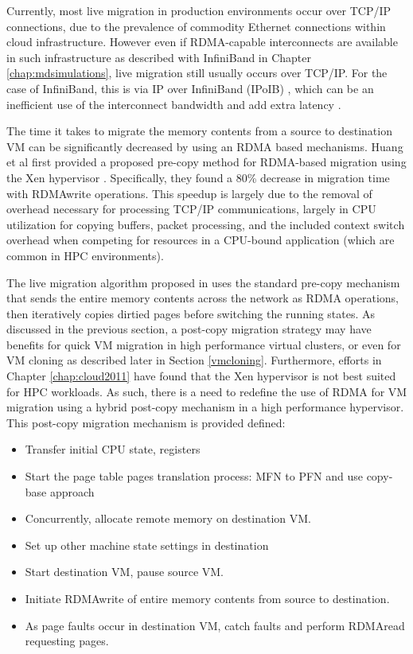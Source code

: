 Currently, most live migration in production environments occur over TCP/IP connections, due to the prevalence of commodity Ethernet connections within cloud infrastructure. However even if RDMA-capable interconnects are available in such infrastructure as described with InfiniBand in Chapter \ref{chap:mdsimulations}, live migration still usually occurs over TCP/IP. For the case of InfiniBand, this is via IP over InfiniBand (IPoIB) \cite{chu2006ipoib}, which can be an inefficient use of the interconnect bandwidth and add extra latency \cite{yu2008performance}. 

The time it takes to migrate the memory contents from a source to destination VM can be significantly decreased by using an RDMA based mechanisms. Huang et al first provided a proposed pre-copy method for RDMA-based migration using the Xen hypervisor \cite{huang2007high}. Specifically, they found a 80\% decrease in migration time with RDMAwrite operations. This speedup is largely due to the removal of overhead necessary for processing TCP/IP communications, largely in CPU utilization for copying buffers, packet processing, and the included context switch overhead when competing for resources in a CPU-bound application (which are common in HPC environments). 

The live migration algorithm proposed in \cite{huang2007high} uses the standard pre-copy mechanism that sends the entire memory contents across the network as RDMA operations, then iteratively copies dirtied pages before switching the running states.  As discussed in the previous section, a post-copy migration strategy may have benefits for quick VM migration in high performance virtual clusters, or even for VM cloning as described later in Section \ref{vmcloning}. Furthermore, efforts in Chapter \ref{chap:cloud2011} have found that the Xen hypervisor is not best suited for HPC workloads.  As such, there is a need to redefine the use of RDMA for VM migration using a hybrid post-copy mechanism in a high performance hypervisor. This post-copy migration mechanism is provided defined:

\begin{itemize}
\item Transfer initial CPU state, registers
\item Start the page table pages translation process: MFN to PFN and use copy-base approach
\item Concurrently, allocate remote memory on destination VM.
\item Set up other machine state settings in destination
\item Start destination VM, pause source VM.
\item Initiate RDMAwrite of entire memory contents from source to destination.
\item As page faults occur in destination VM, catch faults and perform RDMAread requesting pages. 
\end{itemize}

